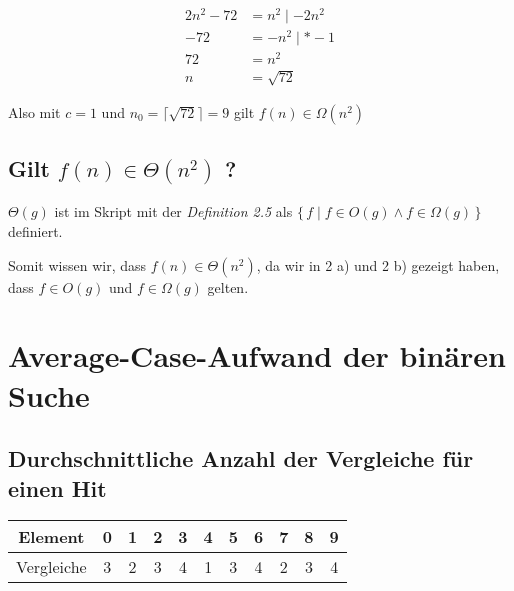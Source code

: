 \documentclass{article}
\begin{document}
\begin{align*}
	2n^2 - 72 & = n^2 \mid - 2n^2 \\
	- 72      & = -n^2 \mid * -1  \\
	72        & = n^2             \\
	n         & = \sqrt{72}
\end{align*}

\vspace{1em}

\begin{flushleft}
	Also mit $c = 1$ und $n_0 = \lceil\sqrt{72}\rceil = 9$ gilt $f(n) \in \Omega(n^2)$
\end{flushleft}

\subsection{Gilt $f(n) \in \Theta(n^2)$ ?}

\begin{flushleft}
	$\Theta(g)$ ist im Skript mit der \emph{Definition 2.5} als $\{ \, f \mid f \in O(g) \wedge f \in \Omega(g) \, \}$ definiert.

	\vspace{0.5em}

	Somit wissen wir, dass $f(n) \in \Theta(n^2)$, da wir in 2 a) und 2 b) gezeigt haben, dass $f \in O(g)$ und $f \in \Omega(g)$ gelten.
\end{flushleft}

\section{Average-Case-Aufwand der binären Suche}

\subsection{Durchschnittliche Anzahl der Vergleiche für einen Hit}

\vspace{1em}

\begin{center}
	\begin{tabular}{|c|c|c|c|c|c|c|c|c|c|c|}
		\hline
		Element    & 0 & 1 & 2 & 3 & 4 & 5 & 6 & 7 & 8 & 9 \\
		\hline
		Vergleiche & 3 & 2 & 3 & 4 & 1 & 3 & 4 & 2 & 3 & 4 \\
		\hline
	\end{tabular}
\end{center}
\end{document}
